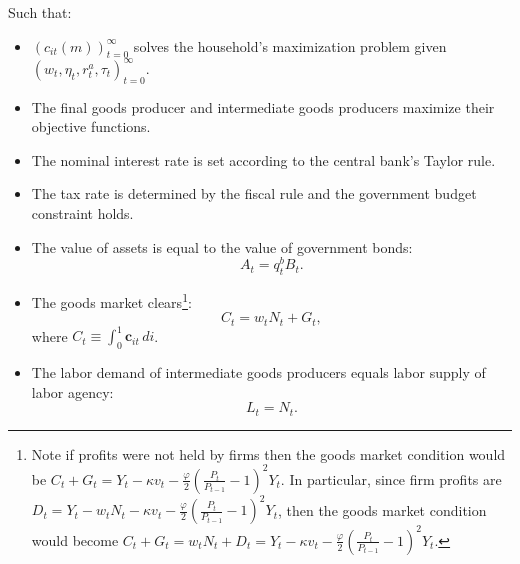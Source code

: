\documentclass[\econtexRoot/HAFiscal]{subfiles}
\begin{document}
Such that: 
\begin{itemize}[label=--]
\item $\left(c_{it}(m)\right)_{t=0}^{\infty}$  solves the household's maximization problem given $\left( w_{t}, \eta_{t},  r^{a}_{t} , \tau_{t} \right)_{t=0}^{\infty}$.
\item The final goods producer and intermediate goods producers maximize their objective functions.
\item The nominal interest rate is set according to the central bank's Taylor rule.
\item The tax rate is determined by the fiscal rule and the government budget constraint holds.
\item The value of assets is equal to the value of government bonds:
 $$A_t =  q^{b}_{t}B_{t}.$$
\item The goods market clears\footnote{Note if profits were not held by firms then the goods market condition would be $ C_{t}  + G_{t}  = Y_{t} -  \kappa v_{t} - \frac{\varphi}{2}\left( \frac{P_{t}}{P_{t-1}} - 1\right)^{2} Y_{t}  $.  In particular, since firm profits are $D_{t} = Y_{t} -  w_{t} N_{t}  - \kappa v_{t} - \frac{\varphi}{2}\left( \frac{P_{t}}{P_{t-1}} - 1\right)^{2} Y_{t} $, then the goods market condition would become $ C_{t}  + G_{t}  =w_{t} N_{t}  + D_{t} = Y_{t} -  \kappa v_{t} - \frac{\varphi}{2}\left( \frac{P_{t}}{P_{t-1}} - 1\right)^{2} Y_{t}  $. }: 
$$ C_{t}  = w_{t} N_{t}  + G_{t},$$
where $C_{t} \equiv  \int_{0}^{1} \textbf{c}_{it} \, di$. 
\item The labor demand of intermediate goods producers equals labor supply of labor agency:
$$ L_{t} =  N_{t}.$$ 
\end{itemize}

%
\end{document}
